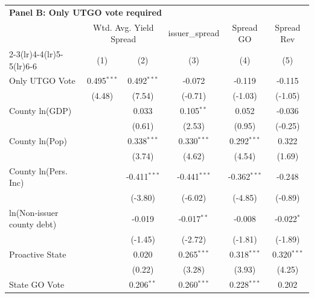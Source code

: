 \begingroup
\centering
\begin{tabular*}{\textwidth}{@{\extracolsep{\fill}}lccccc}
\multicolumn{6}{l}{\textbf{Panel B: Only UTGO vote required}}\\

\addlinespace
   \toprule
    & \multicolumn{2}{c}{Wtd. Avg. Yield Spread} & issuer\_spread & Spread GO & Spread Rev\\
   \cmidrule(lr){2-3}\cmidrule(lr){4-4}\cmidrule(lr){5-5}\cmidrule(lr){6-6}
                              & (1)           & (2)            & (3)            & (4)            & (5)\\  
   \midrule 
   Only UTGO Vote             & 0.495$^{***}$ & 0.492$^{***}$  & -0.072         & -0.119         & -0.115\\   
                              & (4.48)       & (7.54)        & (-0.71)       & (-1.03)       & (-1.05)\\   
   County ln(GDP)             &               & 0.033          & 0.105$^{**}$   & 0.052          & -0.036\\   
                              &               & (0.61)        & (2.53)        & (0.95)        & (-0.25)\\   
   County ln(Pop)             &               & 0.338$^{***}$  & 0.330$^{***}$  & 0.292$^{***}$  & 0.322\\   
                              &               & (3.74)        & (4.62)        & (4.54)        & (1.69)\\   
   County ln(Pers. Inc)       &               & -0.411$^{***}$ & -0.441$^{***}$ & -0.362$^{***}$ & -0.248\\   
                              &               & (-3.80)       & (-6.02)       & (-4.85)       & (-0.89)\\   
   ln(Non-issuer county debt) &               & -0.019         & -0.017$^{**}$  & -0.008         & -0.022$^{*}$\\   
                              &               & (-1.45)       & (-2.72)       & (-1.81)       & (-1.89)\\   
   Proactive State            &               & 0.020          & 0.265$^{***}$  & 0.318$^{***}$  & 0.320$^{***}$\\   
                              &               & (0.22)        & (3.28)        & (3.93)        & (4.25)\\   
   State GO Vote              &               & 0.206$^{**}$   & 0.260$^{***}$  & 0.228$^{***}$  & 0.202\\   

\end{tabular*}
